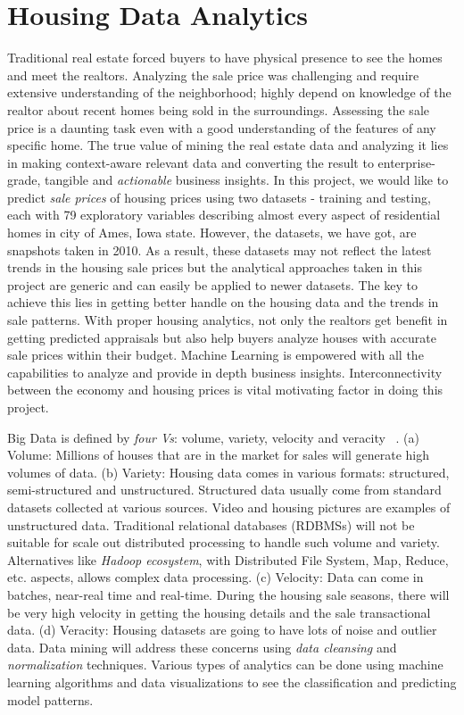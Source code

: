 \documentclass[sigconf]{acmart}
\begin{document}
	\section{Housing Data Analytics}
	
	Traditional real estate forced buyers to have physical presence to see the homes and meet the realtors. Analyzing the sale price was challenging and require extensive understanding of the neighborhood; highly depend on knowledge of the  realtor about recent homes being sold in the surroundings. Assessing the sale price is a daunting task even with a good understanding of the features of any specific home.	The true value of mining the real estate data and analyzing it lies in making context-aware relevant data and converting the result to enterprise-grade, tangible and {\em actionable} business insights. In this project, we would like to predict {\em sale prices} of housing prices using two datasets - training and testing, each with 79 exploratory variables describing almost every aspect of residential homes in city of Ames, Iowa state. However, the datasets, we have got, are snapshots taken in 2010. As a result, these datasets may not reflect the latest trends in the housing sale prices but the analytical approaches taken in this project are generic and can easily be applied to newer datasets. The key to achieve this lies in getting better handle on the housing data and the trends in sale patterns. With proper housing analytics, not only the realtors get benefit in getting predicted appraisals but also help buyers analyze houses with accurate sale prices within their budget. Machine Learning is empowered with all the capabilities to analyze and provide in depth business insights. Interconnectivity between the economy and housing prices is vital motivating factor in doing this project. 
	
	Big Data is defined by {\em four Vs}: volume, variety, velocity and veracity ~\cite{big-data}. (a) Volume: Millions of houses that are in the market for sales will generate high volumes of data. (b) Variety: Housing data comes in various formats: structured, semi-structured and unstructured. Structured data usually come from standard datasets collected at various sources. Video and housing pictures are examples of unstructured data. Traditional relational databases (RDBMSs) will not be suitable for scale out distributed processing to handle such volume and variety. Alternatives like {\em Hadoop ecosystem}, with Distributed File System, Map, Reduce, etc. aspects, allows complex data processing. (c) Velocity: Data can come in batches, near-real time and real-time. During the housing sale seasons, there will be very high velocity in getting the housing details and the sale transactional data. (d) Veracity: Housing datasets are going to have lots of noise and outlier data. Data mining will address these concerns using {\em data cleansing} and {\em normalization} techniques. Various types of analytics can be done using machine learning algorithms and data visualizations to see the classification and predicting model patterns. 
	
\end{document}
